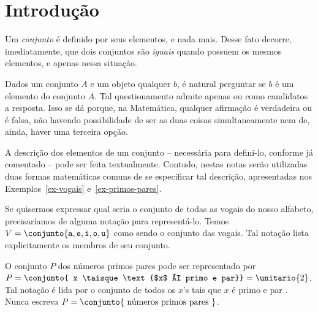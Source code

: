\section{Introdução}
\label{sec:intro}

Um \emph{conjunto} é definido por seus elementos, e nada mais.
Desse fato decorre, imediatamente, que dois conjuntos são \emph{iguais} quando possuem os mesmos elementos, e apenas nessa situação. 

Dados um conjunto $A$ e um objeto qualquer $b$, é natural perguntar se $b$ é um elemento do conjunto $A$. Tal questionamento admite apenas  ou  como candidatos a resposta. Isso se dá porque, na Matemática, qualquer afirmação é verdadeira ou é falsa, não havendo possibilidade de ser as duas coisas simultaneamente nem de, ainda, haver uma terceira opção. 


A descrição dos elementos de um conjunto -- necessária para defini-lo, conforme já comentado -- pode ser feita textualmente. Contudo, nestas notas serão utilizadas duas formas matemáticas comuns de se especificar tal descrição, apresentadas nos Exemplos~\ref{ex-vogais} e~\ref{ex-primos-pares}. 

\begin{example}
    \label{ex-vogais}
    Se quisermos expressar qual seria o conjunto de todas as vogais do nosso alfabeto, precisaríamos de alguma notação para representá-lo. Temos $V = \conjunto{\texttt a, \texttt e, \texttt i, \texttt o, \texttt u}$ como sendo o conjunto das vogais. Tal notação lista explicitamente os membros de seu conjunto.
\end{example}

\begin{example}
    \label{ex-primos-pares}
    O conjunto $P$ dos números primos pares pode ser representado por $P = \conjunto{ x \taisque \text{$x$ é primo e par}} = \unitario{2}$. Tal notação é lida por \abreaspas o conjunto de todos os $x$'s tais que $x$ é primo e par \fechaaspas. Nunca escreva $P = \conjunto{\text{ números primos pares }}$.
\end{example}

